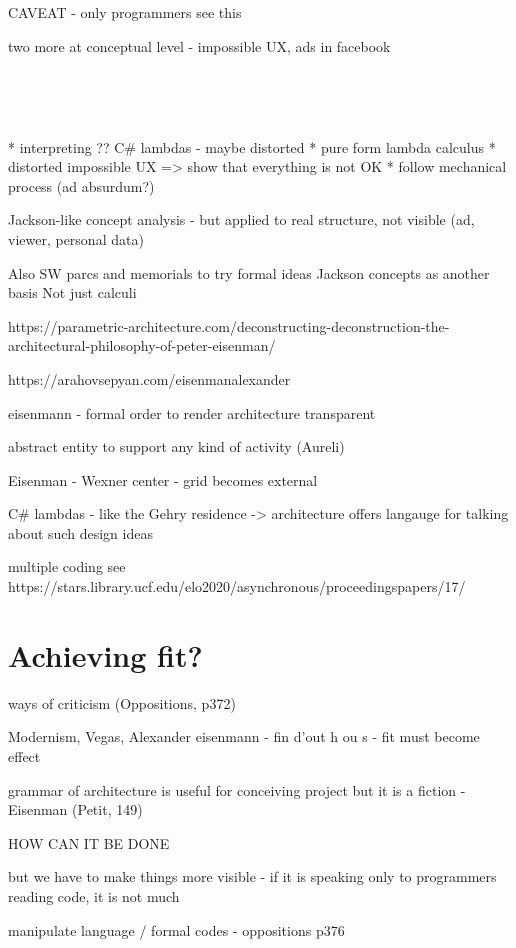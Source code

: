 ~

~

CAVEAT - only programmers see this

two more at conceptual level - impossible UX, ads in facebook

%

~

~


* interpreting
  ??
    C\# lambdas - maybe distorted
* pure form
    lambda calculus
* distorted
    impossible UX
=> show that everything is not OK
* follow mechanical process (ad absurdum?)

Jackson-like concept analysis - but applied to real structure, not visible
(ad, viewer, personal data)

Also SW parcs and memorials to try formal ideas
Jackson concepts as another basis
Not just calculi




https://parametric-architecture.com/deconstructing-deconstruction-the-architectural-philosophy-of-peter-eisenman/

https://arahovsepyan.com/eisenmanalexander

eisenmann - formal order to render architecture transparent

abstract entity to support any kind of activity (Aureli)


Eisenman - Wexner center - grid becomes external

C\# lambdas - like the Gehry residence
-> architecture offers langauge for talking about such design ideas

multiple coding see
https://stars.library.ucf.edu/elo2020/asynchronous/proceedingspapers/17/

\section{Achieving fit?}

ways of criticism (Oppositions, p372)

Modernism, Vegas, Alexander
eisenmann - fin d'out h ou s - fit must become effect

grammar of architecture is useful for conceiving project but it is a fiction - Eisenman (Petit, 149)

\newpage

HOW CAN IT BE DONE

but we have to make things more visible - if it is speaking only to programmers reading code,
it is not much

manipulate language / formal codes - oppositions p376

